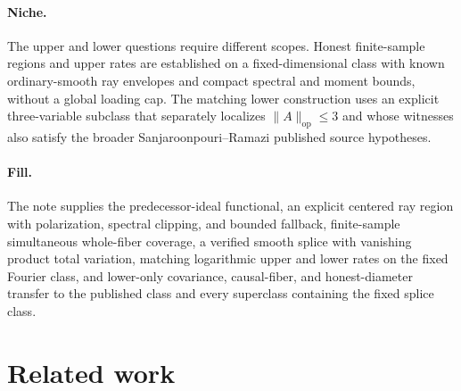 \documentclass{article}
\begin{document}
\paragraph{Niche.} The upper and lower questions require different scopes. Honest finite-sample regions and upper rates are established on a fixed-dimensional class with known ordinary-smooth ray envelopes and compact spectral and moment bounds, without a global loading cap. The matching lower construction uses an explicit three-variable subclass that separately localizes \(\|A\|_{\mathrm{op}}\le3\) and whose witnesses also satisfy the broader Sanjaroonpouri--Ramazi published source hypotheses.

\paragraph{Fill.} The note supplies the predecessor-ideal functional, an explicit centered ray region with polarization, spectral clipping, and bounded fallback, finite-sample simultaneous whole-fiber coverage, a verified smooth splice with vanishing product total variation, matching logarithmic upper and lower rates on the fixed Fourier class, and lower-only covariance, causal-fiber, and honest-diameter transfer to the published class and every superclass containing the fixed splice class.

\section{Related work}
\end{document}
